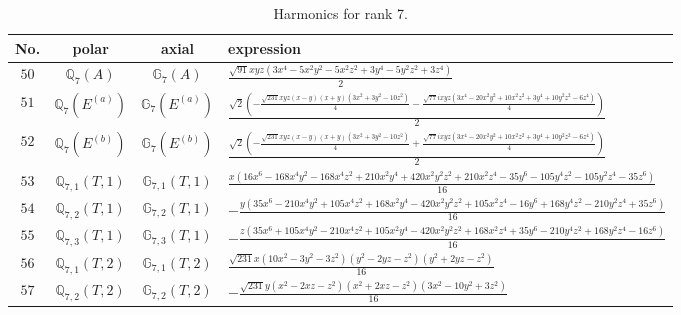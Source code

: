 \documentclass[fleqn,8pt,landscape]{jsarticle}
\begin{document}
\begin{table}[ht!]
\begin{center}
\caption{Harmonics for rank 7.}
\renewcommand{\arraystretch}{1.3}
\begin{tabular}{cccl} \hline \hline
No. & polar & axial & expression \\ \hline
$ 50 $ & $ \mathbb{Q}_{7}(A) $ & $ \mathbb{G}_{7}(A) $ & $ \frac{\sqrt{91} x y z \left(3 x^{4} - 5 x^{2} y^{2} - 5 x^{2} z^{2} + 3 y^{4} - 5 y^{2} z^{2} + 3 z^{4}\right)}{2} $ \\
$ 51 $ & $ \mathbb{Q}_{7}(E^{(a)}) $ & $ \mathbb{G}_{7}(E^{(a)}) $ & $ \frac{\sqrt{2} \left(- \frac{\sqrt{231} x y z \left(x - y\right) \left(x + y\right) \left(3 x^{2} + 3 y^{2} - 10 z^{2}\right)}{4} - \frac{\sqrt{77} i x y z \left(3 x^{4} - 20 x^{2} y^{2} + 10 x^{2} z^{2} + 3 y^{4} + 10 y^{2} z^{2} - 6 z^{4}\right)}{4}\right)}{2} $ \\
$ 52 $ & $ \mathbb{Q}_{7}(E^{(b)}) $ & $ \mathbb{G}_{7}(E^{(b)}) $ & $ \frac{\sqrt{2} \left(- \frac{\sqrt{231} x y z \left(x - y\right) \left(x + y\right) \left(3 x^{2} + 3 y^{2} - 10 z^{2}\right)}{4} + \frac{\sqrt{77} i x y z \left(3 x^{4} - 20 x^{2} y^{2} + 10 x^{2} z^{2} + 3 y^{4} + 10 y^{2} z^{2} - 6 z^{4}\right)}{4}\right)}{2} $ \\
$ 53 $ & $ \mathbb{Q}_{7,1}(T,1) $ & $ \mathbb{G}_{7,1}(T,1) $ & $ \frac{x \left(16 x^{6} - 168 x^{4} y^{2} - 168 x^{4} z^{2} + 210 x^{2} y^{4} + 420 x^{2} y^{2} z^{2} + 210 x^{2} z^{4} - 35 y^{6} - 105 y^{4} z^{2} - 105 y^{2} z^{4} - 35 z^{6}\right)}{16} $ \\
$ 54 $ & $ \mathbb{Q}_{7,2}(T,1) $ & $ \mathbb{G}_{7,2}(T,1) $ & $ - \frac{y \left(35 x^{6} - 210 x^{4} y^{2} + 105 x^{4} z^{2} + 168 x^{2} y^{4} - 420 x^{2} y^{2} z^{2} + 105 x^{2} z^{4} - 16 y^{6} + 168 y^{4} z^{2} - 210 y^{2} z^{4} + 35 z^{6}\right)}{16} $ \\
$ 55 $ & $ \mathbb{Q}_{7,3}(T,1) $ & $ \mathbb{G}_{7,3}(T,1) $ & $ - \frac{z \left(35 x^{6} + 105 x^{4} y^{2} - 210 x^{4} z^{2} + 105 x^{2} y^{4} - 420 x^{2} y^{2} z^{2} + 168 x^{2} z^{4} + 35 y^{6} - 210 y^{4} z^{2} + 168 y^{2} z^{4} - 16 z^{6}\right)}{16} $ \\
$ 56 $ & $ \mathbb{Q}_{7,1}(T,2) $ & $ \mathbb{G}_{7,1}(T,2) $ & $ \frac{\sqrt{231} x \left(10 x^{2} - 3 y^{2} - 3 z^{2}\right) \left(y^{2} - 2 y z - z^{2}\right) \left(y^{2} + 2 y z - z^{2}\right)}{16} $ \\
$ 57 $ & $ \mathbb{Q}_{7,2}(T,2) $ & $ \mathbb{G}_{7,2}(T,2) $ & $ - \frac{\sqrt{231} y \left(x^{2} - 2 x z - z^{2}\right) \left(x^{2} + 2 x z - z^{2}\right) \left(3 x^{2} - 10 y^{2} + 3 z^{2}\right)}{16} $ \\

\end{tabular}
\end{center}
\end{table}
\end{document}
